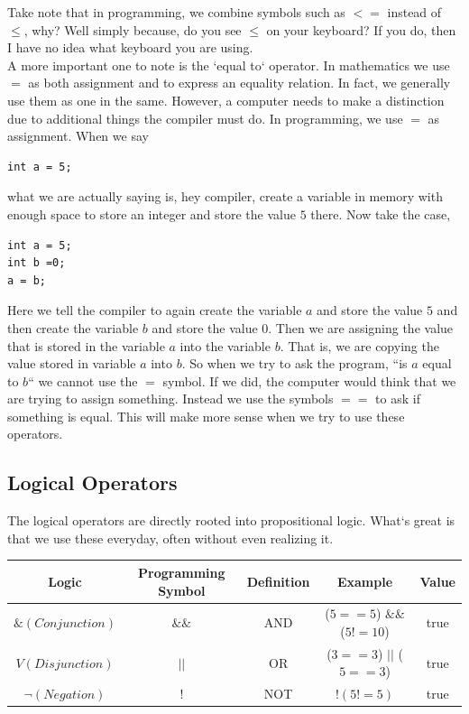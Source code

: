 \documentclass[11]{article}
\begin{document}
Take note that in programming, we combine symbols such as $<=$ instead of $\leq$, why? Well simply because, do you see $\leq$ on your keyboard? If you do, then I have no idea what keyboard you are using. \\

A more important one to note is the 	`equal to` operator. In mathematics we use $=$ as both assignment and to express an equality relation. In fact, we generally use them as one in the same. However, a computer needs to make a distinction due to additional things the compiler must do. In programming, we use $=$ as assignment. When we say 
\begin{lstlisting}
int a = 5;
\end{lstlisting}
what we are actually saying is, hey compiler, create a variable in memory with enough space to store an integer and store the value $5$ there. Now take the case, 
\begin{lstlisting}
int a = 5;
int b =0;
a = b;
\end{lstlisting}

Here we tell the compiler to again create the variable $a$ and store the value $5$ and then create the variable $b$ and store the value $0$. Then we are assigning the value that is stored in the variable $a$ into the variable $b$. That is, we are copying the value stored in variable $a$ into $b$. So when we try to ask the program, ``is $a$ equal to $b$`` we cannot use the $=$ symbol. If we did, the computer would think that we are trying to assign something. Instead we use the symbols $==$ to ask if something is equal. This will make more sense when we try to use these operators.\\

\subsection{Logical Operators}
The logical operators are directly rooted into propositional logic. What`s great is that we use these everyday, often without even realizing it.

\begin{center}
  \begin{tabular}{ | c | c | c | c | c |}
    \hline
    Logic & Programming Symbol & Definition & Example & Value \\ \hline
    $\& (Conjunction)$ & $\&\&$ & AND & ($5==5$) $\&\&$ ($5!=10$) & true \\ \hline
    $V (Disjunction)$ & $||$ & OR & ($3==3$) $||$ ($5==3$) & true \\ \hline
    $\lnot (Negation)$ & $!$ & NOT &  $!(5 != 5)$ & true \\ 
    \hline
  \end{tabular}
\end{center}
\end{document}
